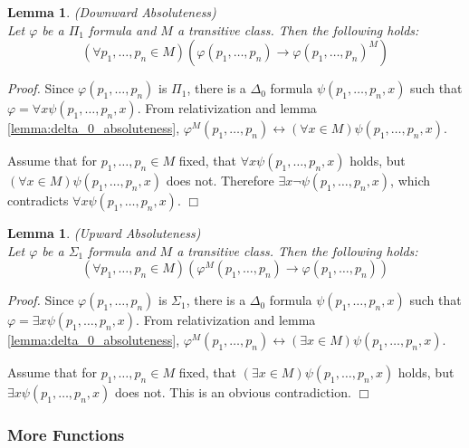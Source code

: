 \documentclass[12pt,a4paper]{article}
\newtheorem{lemma}[theorem]{Lemma}
\newenvironment{proof}
{\noindent \textit{Proof.}}
{\hspace*{\fill} $\Box$}
\renewcommand{\iff}{\leftrightarrow}
\newcommand{\then}{\rightarrow}
\begin{document}
\begin{lemma}{(Downward Absoluteness)}\label{lemma:downward_absoluteness}\\
Let $\varphi$ be a $\Pi_1$ formula and $M$ a transitive class. Then the following holds:
\begin{equation}
(\forall p_1, \ldots, p_n \in M)(\varphi(p_1, \ldots, p_n) \then \varphi(p_1, \ldots, p_n)^M)
\end{equation}
\end{lemma}
\begin{proof}
Since $\varphi(p_1, \ldots, p_n)$ is $\Pi_1$, there is a $\Delta_0$ formula $\psi(p_1, \ldots, p_n, x)$ such that $\varphi = \forall x \psi(p_1, \ldots, p_n, x)$. From relativization and lemma \ref{lemma:delta_0_absoluteness}, $\varphi^M(p_1, \ldots, p_n) \iff (\forall x \in M)\psi(p_1, \ldots, p_n, x)$.

Assume that for $p_1, \ldots, p_n \in M$ fixed, that $\forall x \psi(p_1, \ldots, p_n, x)$ holds, but $(\forall x \in M)\psi(p_1, \ldots, p_n, x)$ does not. 
Therefore $\exists x \neg \psi(p_1, \ldots, p_n, x)$, which contradicts $\forall x \psi(p_1, \ldots, p_n, x)$.
\end{proof}


\begin{lemma}{(Upward Absoluteness)}\label{lemma:upward_absoluteness}\\
Let $\varphi$ be a $\Sigma_1$ formula and $M$ a transitive class. Then the following holds:
\begin{equation}
(\forall p_1, \ldots, p_n \in M)(\varphi^M(p_1, \ldots, p_n) \then \varphi(p_1, \ldots, p_n))
\end{equation}
\end{lemma}
\begin{proof}
Since $\varphi(p_1, \ldots, p_n)$ is $\Sigma_1$, there is a $\Delta_0$ formula $\psi(p_1, \ldots, p_n, x)$ such that $\varphi = \exists x \psi(p_1, \ldots, p_n, x)$. From relativization and lemma \ref{lemma:delta_0_absoluteness}, $\varphi^M(p_1, \ldots, p_n) \iff (\exists x \in M)\psi(p_1, \ldots, p_n, x)$.

Assume that for $p_1, \ldots, p_n \in M$ fixed, that $(\exists x \in M)\psi(p_1, \ldots, p_n, x)$ holds, but $\exists x \psi(p_1, \ldots, p_n, x)$ does not. This is an obvious contradiction.
\end{proof}


\subsubsection{More Functions}
\end{document}
